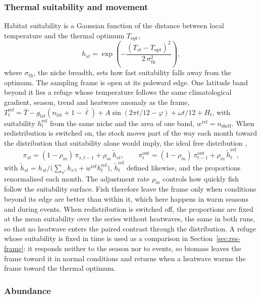 \documentclass[11pt,a4paper]{article}
\newcommand{\vt}[1]{\text{#1}}
\begin{document}
\subsubsection{Thermal suitability and movement}

Habitat suitability is a Gaussian function of the distance between local temperature and the thermal optimum $T_{\vt{opt}}$,
\begin{equation}
h_{st} = \exp\!\left(-\frac{(T_{st}-T_{\vt{opt}})^2}{2\,\sigma_{\vt{th}}^2}\right),
\label{eq:suit}
\end{equation}
where $\sigma_{\vt{th}}$, the niche breadth, sets how fast suitability falls away from the optimum. The sampling frame is open at its poleward edge. One latitude band beyond it lies a refuge whose temperature follows the same climatological gradient, season, trend and heatwave anomaly as the frame, $T^{\vt{ref}}_t = \bar T - g_{\vt{lat}}(n_{\vt{lat}}+1-\bar\ell) + A\sin(2\pi t/12-\varphi) + \omega t/12 + H_t$, with suitability $h^{\vt{ref}}_t$ from the same niche and the area of one band, $w^{\vt{ref}} = n_{\vt{shelf}}$. When redistribution is switched on, the stock moves part of the way each month toward the distribution that suitability alone would imply, the ideal free distribution \citep{fretwell1969},
\begin{equation}
\pi_{st} = (1-\rho_m)\,\pi_{s,t-1} + \rho_m\,\tilde h_{st}, \qquad \pi^{\vt{out}}_t = (1-\rho_m)\,\pi^{\vt{out}}_{t-1} + \rho_m\,\tilde h^{\vt{ref}}_t,
\label{eq:move}
\end{equation}
with $\tilde h_{st} = h_{st}\big/\big(\sum_{s'}h_{s't} + w^{\vt{ref}}h^{\vt{ref}}_t\big)$, $\tilde h^{\vt{ref}}_t$ defined likewise, and the proportions renormalised each month. The adjustment rate $\rho_m$ controls how quickly fish follow the suitability surface. Fish therefore leave the frame only when conditions beyond its edge are better than within it, which here happens in warm seasons and during events. When redistribution is switched off, the proportions are fixed at the mean suitability over the series without heatwaves, the same in both runs, so that no heatwave enters the paired contrast through the distribution. A refuge whose suitability is fixed in time is used as a comparison in Section~\ref{sec:res-frame}: it responds neither to the season nor to events, so biomass leaves the frame toward it in normal conditions and returns when a heatwave warms the frame toward the thermal optimum.

\subsubsection{Abundance}
\end{document}
